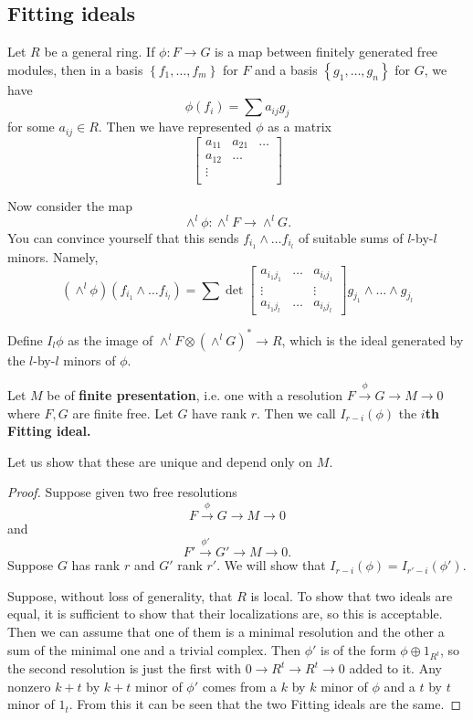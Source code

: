 \subsection{Fitting ideals}




Let $R$ be a general ring. If $\phi: F \to G$ is a map between finitely
generated free modules, then in a basis $\left\{f_1, \dots, f_m\right\}$ for
$F$ and a basis $\left\{g_1, \dots, g_n\right\}$ for $G$, we have
\[ \phi(f_i) = \sum a_{ij} g_j  \]
for some  $a_{ij} \in R$.  Then we have represented $\phi$ as a matrix
\[ \begin{bmatrix}
a_{11} & a_{21} & \dots \\
a_{12} & \dots \\
\vdots \\
\end{bmatrix}\]

Now consider the map
\[ \wedge^l \phi: \wedge^l F \to \wedge^l G.   \]
You can convince yourself that this sends $f_{i_1} \wedge \dots f_{i_l}$ of
suitable sums of $l$-by-$l$ minors. 
Namely,
\[ (\wedge^l \phi)(f_{i_1} \wedge \dots f_{i_l}) = \sum \det \begin{bmatrix}
 a_{i_1 j_1} & \dots  & a_{i_l j_1} \\
 \vdots & & \vdots \\
 a_{i_1 j_l} & \dots & a_{i_l j_l} \end{bmatrix}g_{j_1} \wedge \dots \wedge g_{j_l}
\]


\begin{definition} 
Define $I_l \phi$ as the image of $\wedge^l F \otimes (\wedge^l G)^* \to R$,
which is the ideal generated by the $l$-by-$l$ minors of $\phi$.
\end{definition} 

\begin{definition} 
Let $M$ be of \textbf{finite presentation}, i.e. one with a resolution $F
\stackrel{\phi}{\to} G
\to M \to 0$ where $F, G$ are finite free. Let $G$ have rank $r$.
Then we call $I_{r-i}(\phi) $ the \textbf{$i$th Fitting ideal.}
\end{definition} 

Let us show that these are unique and depend only on $M$. 
\begin{proof} 
Suppose given two free resolutions
\[ F \stackrel{\phi}{\to} G \to M \to 0  \] 
and
\[ F' \stackrel{\phi'}{\to} G' \to M \to 0 . \] 
Suppose $G$ has rank $r$ and $G'$ rank $r'$.
We will show that $I_{r-i}(\phi) = I_{r' - i}(\phi')$. 

Suppose, without loss of generality, that $R$ is local. To show that two ideals
are equal, it is sufficient to show that their localizations are, so this is
acceptable.
Then we can assume that one of them is a minimal resolution and the other a sum
of the minimal one and a trivial complex.  
Then $\phi'$ is of the form $\phi \oplus 1_{R^t}$, so the second resolution is
just the first with $0 \to R^t \to R^t \to 0$ added to it.
Any nonzero $k+t$ by $k+t$ minor of $\phi'$ comes from a $k$ by $k$ minor of
$\phi$ and a $t$ by $t$ minor of $1_t$.  From this it can be seen that the two
Fitting ideals are the same. 

\end{proof} 


